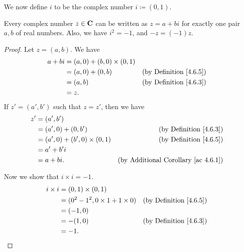 \begin{note}
    We now define \(i\) to be the complex number \(i \coloneqq (0, 1)\).
\end{note}

\begin{lemma}\label{4.6.7}
    Every complex number \(z \in \mathbf{C}\) can be written as \(z = a + bi\) for exactly one pair \(a, b\) of real numbers.
    Also, we have \(i^2 = -1\), and \(-z = (-1)z\).
\end{lemma}

\begin{proof}
    Let \(z = (a, b)\).
    We have
    \begin{align*}
        a + bi & = (a, 0) + (b, 0) \times (0, 1)                                      \\
               & = (a, 0) + (0, b)               & \text{(by Definition \ref{4.6.5})} \\
               & = (a, b)                        & \text{(by Definition \ref{4.6.3})} \\
               & = z.
    \end{align*}
    If \(z' = (a', b')\) such that \(z = z'\), then we have
    \begin{align*}
        z' & = (a', b')                                                                          \\
           & = (a', 0) + (0, b')               & \text{(by Definition \ref{4.6.3})}              \\
           & = (a', 0) + (b', 0) \times (0, 1) & \text{(by Definition \ref{4.6.5})}              \\
           & = a' + b' i                                                                         \\
           & = a + bi.                         & \text{(by Additional Corollary \ref{ac 4.6.1})}
    \end{align*}

    Now we show that \(i \times i = -1\).
    \begin{align*}
        i \times i & = (0, 1) \times (0, 1)                                                      \\
                   & = (0^2 - 1^2, 0 \times 1 + 1 \times 0) & \text{(by Definition \ref{4.6.5})} \\
                   & = (-1, 0)                                                                   \\
                   & = -(1, 0)                              & \text{(by Definition \ref{4.6.3})} \\
                   & = -1.
    \end{align*}


\end{proof}
